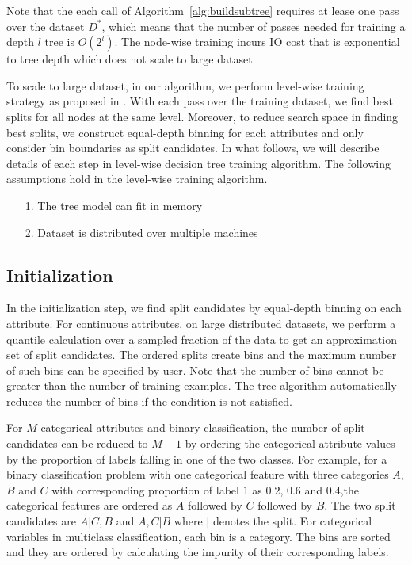 Note that the each call of Algorithm~\ref{alg:buildsubtree} requires at lease
one pass over the dataset $D^*$, which means that the number of passes needed
for training a depth $l$ tree is $O(2^l)$. The node-wise training incurs IO
cost that is exponential to tree depth which does not scale to large dataset.

To scale to large dataset, in our algorithm, we perform level-wise training
strategy as proposed in \cite{panda2009planet}. With each
pass over the training dataset, we find best splits for all nodes at the same
level. Moreover, to reduce search space in finding best splits, we construct
equal-depth binning for each attributes and only consider bin boundaries as split
candidates. In what follows, we will describe details of each step in level-wise
decision tree training algorithm. The following assumptions hold in the level-wise
training algorithm.

\begin{itemize}
\item[1.] The tree model can fit in memory
\item[2.] Dataset is distributed over multiple machines
\end{itemize}

\subsection{Initialization}
In the initialization step, we find split candidates by equal-depth binning on
each attribute. For continuous attributes, on large distributed datasets, we
perform a quantile calculation over a sampled fraction of the data to get an
approximation set of split candidates. The ordered splits create bins and the
maximum number of such bins can be specified by user. Note that the number of
bins cannot be greater than the number of training examples. The tree algorithm
automatically reduces the number of bins if the condition is not satisfied.

For $M$ categorical attributes and binary classification, the number of split
candidates can be reduced to $M-1$ by ordering the categorical attribute values
by the proportion of labels falling in one of the two classes. For example, for
a binary classification problem with one categorical feature with three
categories $A$, $B$ and $C$ with corresponding proportion of label $1$ as $0.2$,
$0.6$ and $0.4$,the categorical features are ordered as $A$ followed by $C$
followed by $B$. The two split candidates are $A|C,B$ and $A,C|B$
where $|$ denotes the split. For categorical variables in multiclass classification,
each bin is a category. The bins are sorted and they are ordered by calculating
the impurity of their corresponding labels.

